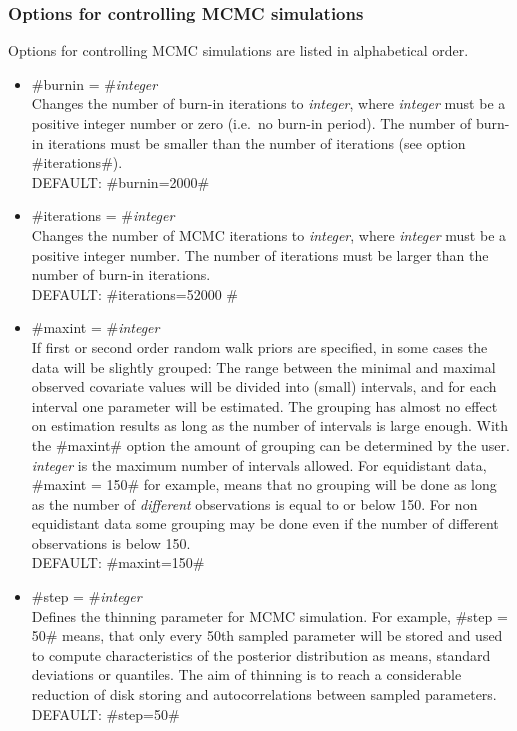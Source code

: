 \vspace{0.4cm}

\subsubsection*{Options for controlling MCMC simulations}
\label{mcmc_options}

Options for controlling MCMC simulations are listed in
alphabetical order.

\begin{itemize}
\item #burnin = #{\em integer } \\
Changes the number of burn-in iterations to {\em integer}, where
{\em integer} must be a positive integer number or zero (i.e.~no
burn-in period).
The number of burn-in iterations must be smaller than the number of iterations (see option #iterations#). \\
DEFAULT: #burnin=2000#

\item #iterations = #{\em integer } \\
Changes the number of MCMC iterations to {\em integer}, where {\em
integer} must be a positive integer number. The number of
iterations must be larger than the
number of burn-in iterations. \\
DEFAULT: #iterations=52000 #


\item #maxint = #{\em integer } \\
If first or second order random walk priors are specified, in some
cases the data will be slightly grouped: The range between the
minimal and maximal observed covariate values will be divided into
(small) intervals, and for each interval one parameter will be
estimated. The grouping has almost no effect on estimation results
as long as the number of intervals is large enough. With the
#maxint# option the amount of grouping can be determined by the
user. {\em integer} is the maximum number of intervals allowed.
For equidistant data, #maxint = 150# for example, means that no
grouping will be done as long as the number of {\em different}
observations is equal to or below 150. For non equidistant
data some grouping may be done even if the number of different observations is below 150. \\
DEFAULT: #maxint=150#

\item #step = #{\em integer} \\
Defines the thinning parameter for MCMC simulation. For example,
#step = 50# means, that only every 50th sampled parameter will be
stored and used to compute characteristics of the posterior
distribution as means, standard deviations or quantiles. The aim
of thinning is to reach a considerable reduction of disk storing
and autocorrelations between sampled parameters.\\
DEFAULT: #step=50#

\end{itemize}

